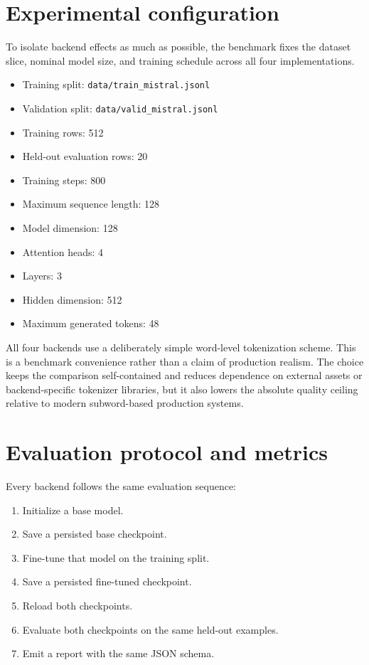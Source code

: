 \documentclass[11pt]{article}
\begin{document}
\section{Experimental configuration}

To isolate backend effects as much as possible, the benchmark fixes the dataset slice, nominal model size, and training schedule across all four implementations.

\begin{itemize}
    \item Training split: \texttt{data/train\_mistral.jsonl}
    \item Validation split: \texttt{data/valid\_mistral.jsonl}
    \item Training rows: 512
    \item Held-out evaluation rows: 20
    \item Training steps: 800
    \item Maximum sequence length: 128
    \item Model dimension: 128
    \item Attention heads: 4
    \item Layers: 3
    \item Hidden dimension: 512
    \item Maximum generated tokens: 48
\end{itemize}

All four backends use a deliberately simple word-level tokenization scheme. This is a benchmark convenience rather than a claim of production realism. The choice keeps the comparison self-contained and reduces dependence on external assets or backend-specific tokenizer libraries, but it also lowers the absolute quality ceiling relative to modern subword-based production systems.

\section{Evaluation protocol and metrics}

Every backend follows the same evaluation sequence:

\begin{enumerate}
    \item Initialize a base model.
    \item Save a persisted base checkpoint.
    \item Fine-tune that model on the training split.
    \item Save a persisted fine-tuned checkpoint.
    \item Reload both checkpoints.
    \item Evaluate both checkpoints on the same held-out examples.
    \item Emit a report with the same JSON schema.
\end{enumerate}
\end{document}
